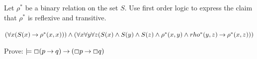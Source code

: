 \documentclass[addpoints]{exam}
\theoremstyle{definition}
\begin{document}
\begin{questions}

\clearpage
\question[4] Let $\rho^*$ be a binary relation on the set $S$. Use first order logic to
express the claim that $\rho^*$ is reflexive and transitive.
\begin{solution}
$(\forall x (S(x) \mathbin{\rightarrow} \rho^*(x,x))) \land (\forall x\forall y \forall z (S(x)
      \land S(y) \land S(z) \land \rho^*(x,y) \land rho^*(y,z) \mathbin{\rightarrow} \rho^*(x,z)))$
\end{solution}
\vspace{50mm}



\bonusquestion[5] Prove: $\models \Box (p \mathbin{\rightarrow} q) \mathbin{\rightarrow} (\Box p \mathbin{\rightarrow} \Box q)$






\end{questions}
\end{document}
